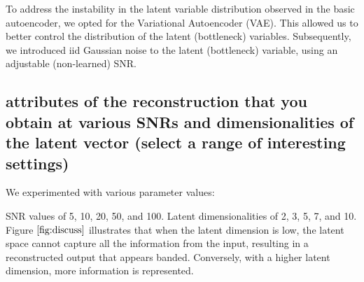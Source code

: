 \documentclass{article}
\begin{document}
To address the instability in the latent variable distribution observed in the basic autoencoder, we opted for the Variational Autoencoder (VAE). This allowed us to better control the distribution of the latent (bottleneck) variables. Subsequently, we introduced iid Gaussian noise to the latent (bottleneck) variable, using an adjustable (non-learned) SNR.
\subsection{attributes of the reconstruction that you obtain at various SNRs and dimensionalities of the latent vector (select a range of interesting settings)}
\label{ssec:discuss}

We experimented with various parameter values:

SNR values of 5, 10, 20, 50, and 100.
Latent dimensionalities of 2, 3, 5, 7, and 10.
Figure $\ref{fig:discuss}$ illustrates that when the latent dimension is low, the latent space cannot capture all the information from the input, resulting in a reconstructed output that appears banded. Conversely, with a higher latent dimension, more information is represented.
\end{document}
